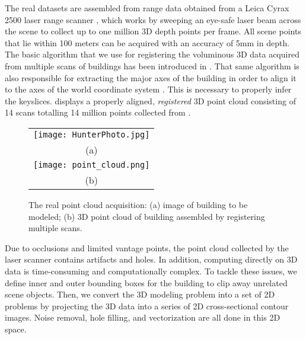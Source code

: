 The real datasets are assembled from range data obtained from
a Leica Cyrax 2500 laser range scanner \cite{RDP_LRS},
which works by sweeping an eye-safe laser beam across the scene to collect
up to one million 3D depth points per frame.
All scene points that lie within 100 meters can be acquired with an accuracy
of 5mm in depth.
The basic algorithm that we use for registering the voluminous 3D data
acquired from multiple scans of buildings has been introduced in
\cite{RDP_LS}.
That same algorithm is also responsible for extracting the major axes
of the building in order to align it to the axes of the world coordinate
system \cite{RDP_LSYGS,Stamos08}.
This is necessary to properly infer the keyslices.
 displays a properly aligned, {\it registered} 3D point cloud
consisting of 14 scans totalling 14 million points
collected from .

\begin{figure}[htbp]
\begin{center}
\begin{tabular}{c}
	\texttt{[image: HunterPhoto.jpg]} \\
	(a)\\
	\texttt{[image: point\_cloud.png]} \\
	(b)
\end{tabular}
\end{center}
\caption{
The real point cloud acquisition:
(a) image of building to be modeled;
(b) 3D point cloud of building assembled by registering multiple scans.
}
\label{fig:IR_2_DXF}
\end{figure}

Due to occlusions and limited vantage points, the point cloud collected by the
laser scanner contains artifacts and holes.
In addition, computing directly on 3D data is time-consuming and
computationally complex.
To tackle these issues, we define inner and outer bounding boxes for the
building to clip away unrelated scene objects.
Then, we convert the 3D modeling problem into a set of 2D problems by
projecting the 3D data into a series of 2D cross-sectional contour images.
Noise removal, hole filling, and vectorization are all done in this
2D space.


